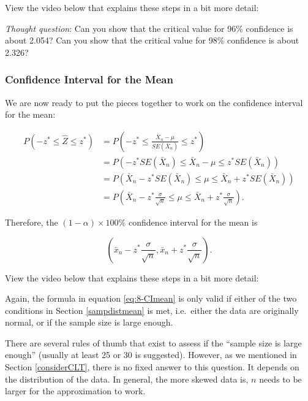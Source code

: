 \documentclass[
]{book}
\begin{document}
View the video below that explains these steps in a bit more detail:

\emph{Thought question}: Can you show that the critical value for 96\% confidence is about 2.054? Can you show that the critical value for 98\% confidence is about 2.326?

\hypertarget{confidence-interval-for-the-mean}{%
\subsubsection{Confidence Interval for the Mean}\label{confidence-interval-for-the-mean}}

We are now ready to put the pieces together to work on the confidence interval for the mean:

\begin{equation} 
\begin{split}
P(-z^{*} \leq \hat{Z} \leq z^{*}) &= P(-z^{*} \leq \frac{\bar{X}_n - \mu}{SE(\bar{X}_n)} \leq z^{*}) \\
                                  &= P\left(-z^{*}SE(\bar{X}_n) \leq \bar{X}_n - \mu \leq z^{*}SE(\bar{X}_n)\right) \\
                                  &= P\left(\bar{X}_n - z^{*}SE(\bar{X}_n) \leq \mu \leq \bar{X}_n + z^{*}SE(\bar{X}_n)\right) \\
                                  &= P\left(\bar{X}_n - z^{*} \frac{\sigma}{\sqrt{n}} \leq \mu \leq \bar{X}_n + z^{*} \frac{\sigma}{\sqrt{n}}\right).
\end{split}
\label{eq:8-CImeanwork}
\end{equation}

Therefore, the \((1-\alpha) \times 100\%\) confidence interval for the mean is

\begin{equation} 
\left( \bar{x}_n - z^{*} \frac{\sigma}{\sqrt{n}}, \bar{x}_n + z^{*} \frac{\sigma}{\sqrt{n}} \right).
\label{eq:8-CImean}
\end{equation}

View the video below that explains these steps in a bit more detail:

Again, the formula in equation \eqref{eq:8-CImean} is only valid if either of the two conditions in Section \ref{sampdistmean} is met, i.e.~either the data are originally normal, or if the sample size is large enough.

There are several rules of thumb that exist to assess if the ``sample size is large enough'' (usually at least 25 or 30 is suggested). However, as we mentioned in Section \ref{considerCLT}, there is no fixed answer to this question. It depends on the distribution of the data. In general, the more skewed data is, \(n\) needs to be larger for the approximation to work.
\end{document}
